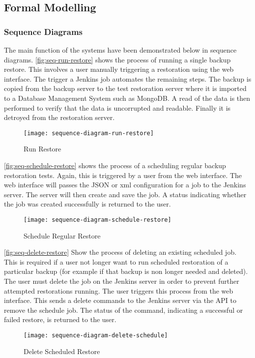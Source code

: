 	\subsection{Formal Modelling}
	\subsubsection{Sequence Diagrams}
	
		The main function of the systems have been demonstrated below in sequence diagrams. \autoref{fig:seq-run-restore} shows the process of running a single backup restore. This involves a user manually triggering a restoration using the web interface. The trigger a Jenkins job automates the remaining steps. The backup is copied from the backup server to the test restoration server where it is imported to a Database Management System such as MongoDB. A read of the data is then performed to verify that the data is uncorrupted and readable. Finally it is detroyed from the restoration server.
		\begin{figure}[H]
			\setlength{\belowcaptionskip}{15pt plus 3pt minus 2pt}
			\caption{Run Restore}
			\centering
			\texttt{[image: sequence-diagram-run-restore]}
			\label{fig:seq-run-restore}
		\end{figure}

		\noindent \autoref{fig:seq-schedule-restore} shows the process of a scheduling regular backup restoration tests. Again, this is triggered by a user from the web interface. The web interface will passes the JSON or xml configuration for a job to the Jenkins server. The server will then create and save the job. A status indicating whether the job was created successfully is returned to the user. 
		\begin{figure}[H]
			\setlength{\belowcaptionskip}{15pt plus 3pt minus 2pt}
			\caption{Schedule Regular Restore}
			\centering
			\texttt{[image: sequence-diagram-schedule-restore]}
			\label{fig:seq-schedule-restore}
		\end{figure}
		
		\noindent \autoref{fig:seq-delete-restore} Show the process of deleting an existing scheduled job. This is required if a user not longer want to run scheduled restoration of a particular backup (for example if that backup is non longer needed and deleted). The user must delete the job on the Jenkins server in order to prevent further attempted restorations running. The user triggers this process from the web interface. This sends a delete commands to the Jenkins server via the API to remove the schedule job. The status of the command, indicating a successful or failed restore, is returned to the user. 
		\begin{figure}[H]
			\setlength{\belowcaptionskip}{15pt plus 3pt minus 2pt}
			\caption{Delete Scheduled Restore}
			\centering
			\texttt{[image: sequence-diagram-delete-schedule]}
			\label{fig:seq-delete-restore}
		\end{figure}
	
